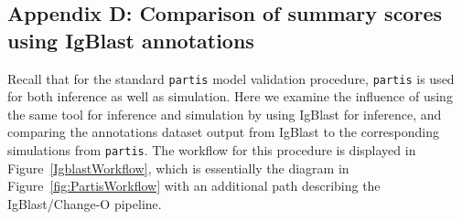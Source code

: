 \documentclass{article}
\begin{document}
\subsection*{Appendix D: Comparison of summary scores using IgBlast annotations}
Recall that for the standard \texttt{partis} model validation procedure, \texttt{partis} is used for both inference as well as simulation.
Here we examine the influence of using the same tool for inference and simulation by using IgBlast for inference, and comparing the annotations dataset output from IgBlast to the corresponding simulations from \texttt{partis}.
The workflow for this procedure is displayed in Figure~\ref{IgblastWorkflow}, which is essentially the diagram in Figure~\ref{fig:PartisWorkflow} with an additional path describing the IgBlast/Change-O pipeline.
\end{document}
